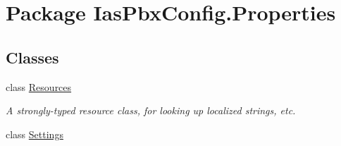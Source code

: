 \hypertarget{namespace_ias_pbx_config_1_1_properties}{
\section{Package IasPbxConfig.Properties}
\label{namespace_ias_pbx_config_1_1_properties}
}
\subsection*{Classes}
\begin{DoxyCompactItemize}
\item 
class \hyperlink{class_ias_pbx_config_1_1_properties_1_1_resources}{Resources}
\begin{DoxyCompactList}\small\item\em A strongly-\/typed resource class, for looking up localized strings, etc. \item\end{DoxyCompactList}\item 
class \hyperlink{class_ias_pbx_config_1_1_properties_1_1_settings}{Settings}
\end{DoxyCompactItemize}

